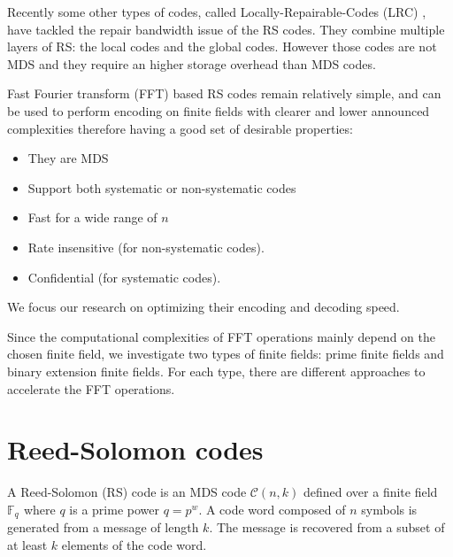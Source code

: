 \documentclass[oneside,9pt]{article}
\newcommand{\ec}[2]{ \mathcal{C}(#1, #2) }
\newcommand{\gf}[2][]{ \mathbb{F}_{{#2}^{#1}} }
\begin{document}
Recently some other types of codes, called Locally-Repairable-Codes (LRC) \cite{xor_elephant} \cite{erasure_azure}, have tackled the repair bandwidth issue of the RS codes. They combine multiple layers of RS: the local codes and the global codes. However those codes are not MDS and they require an higher storage overhead than MDS codes.

Fast Fourier transform (FFT) based RS codes remain relatively simple, and can be used to perform encoding on finite fields with clearer and lower announced complexities therefore having a good set of desirable properties:
\begin{itemize}
\item They are MDS
\item Support both systematic or non-systematic codes
\item Fast for a wide range of $n$
\item Rate insensitive (for non-systematic codes).
\item Confidential (for systematic codes).
\end{itemize}
We focus our research on optimizing their encoding and decoding speed.
% 
% 

Since the computational complexities of FFT operations mainly depend on the chosen finite field, we investigate two types of finite fields: prime finite fields and binary extension finite fields. For each type, there are different approaches to accelerate the FFT operations.

 

\section{Reed-Solomon codes}

A Reed-Solomon (RS) code is an MDS code $\ec{n}{k}$ defined over a finite field $\gf{q}$ where $q$ is a prime power $q=p^w$. A code word composed of $n$ symbols is generated from a message of length $k$. The message is recovered from a subset of at least $k$ elements of the code word.
% 
% 
\end{document}
